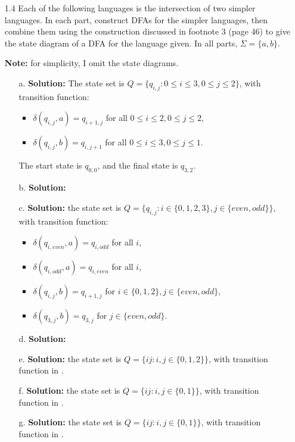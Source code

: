 \begin{enumerate}
\item[1.4]Each of the following languages is the intersection of two simpler languages. In each part, construct DFAs for the simpler languages, then combine them using the construction discussed in footnote 3 (page 46) to give the state diagram of a DFA for the language given. In all parts, $\Sigma = \{a, b\}$.

\par \textbf{Note:} for simplicity, I omit the state diagrams. 
\begin{enumerate}
\item[a.]\textbf{Solution:} The state set is $Q = \{q_{i, j} \colon 0 \le i \le 3, 0 \le j \le 2\}$, with transition function:
\begin{itemize}
\item $\delta(q_{i, j}, a) = q_{i+1, j}$ for all $0 \le i \le 2, 0 \le j \le 2$,
\item $\delta(q_{i, j}, b) = q_{i, j+1}$ for all $0 \le i \le 3, 0 \le j \le 1$.
\end{itemize}
The start state is $q_{0, 0}$, and the final state is $q_{3, 2}$. 
\item[b.]\textbf{Solution:} \alreadyanswered
\item[c.]\textbf{Solution:} the state set is $Q = \{q_{i, j} \colon i \in \{0, 1, 2, 3\}, j \in \{even, odd\}\}$, with transition function:
\begin{itemize}
\item $\delta(q_{i, even}, a) = q_{i, odd}$ for all $i$,
\item $\delta(q_{i, odd}, a) = q_{i, even}$ for all $i$,
\item $\delta(q_{i, j}, b) = q_{i+1, j}$ for $i \in \{0, 1, 2\}, j \in \{even, odd\}$,
\item $\delta(q_{3, j}, b) = q_{3, j}$ for $j \in \{even, odd\}$.
\end{itemize}

\item[d.]\textbf{Solution:} \alreadyanswered

\item[e.]\textbf{Solution:} the state set is $Q = \{ij \colon i,j \in \{0, 1, 2\}\}$, with transition function in .

\item[f.]\textbf{Solution:} the state set is $Q = \{ij \colon i,j \in \{0, 1\}\}$, with transition function in .

\item[g.]\textbf{Solution:} the state set is $Q = \{ij \colon i,j \in \{0, 1\}\}$, with transition function in .


\end{enumerate}
\end{enumerate}
